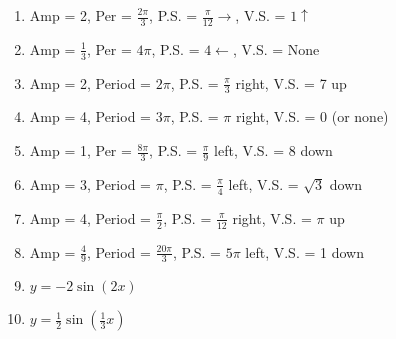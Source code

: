 \begin{enumerate}
	\item Amp = 2, Per = $\frac{2\pi}{3}$, P.S. = $\frac{\pi}{12} \rightarrow$, V.S. = $1 \uparrow$
    \item Amp = $\frac{1}{3}$, Per = $4\pi$, P.S. = $4 \leftarrow$, V.S. = None
    \item Amp = 2, Period = $2\pi$, P.S. = $\frac{\pi}{3}$ right, V.S. = 7 up
    \item Amp = 4, Period = $3\pi$, P.S. = $\pi$ right, V.S. = 0 (or none)
    \item Amp = 1, Per = $\frac{8\pi}{3}$, P.S. = $\frac{\pi}{9}$ left, V.S. = 8 down
	\item Amp = 3, Period = $\pi$, P.S. = $\frac{\pi}{4}$ left, V.S. = $\sqrt{3}$ down
	\item Amp = 4, Period = $\frac{\pi}{2}$, P.S. = $\frac{\pi}{12}$ right, V.S. = $\pi$ up
	\item Amp = $\frac{4}{9}$, Period = $\frac{20\pi}{3}$, P.S. = $5\pi$ left, V.S. = 1 down
    
    \item $y = -2\sin(2x)$
	\item $y = \frac{1}{2}\sin\left(\frac{1}{3}x\right)$
\end{enumerate}